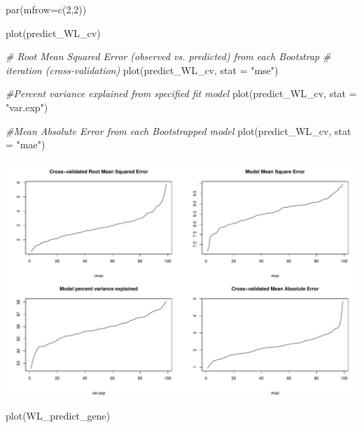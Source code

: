 \documentclass[
]{article}
\newenvironment{Shaded}{\begin{snugshade}}{\end{snugshade}}
\newcommand{\AttributeTok}[1]{\textcolor[rgb]{0.77,0.63,0.00}{#1}}
\newcommand{\CommentTok}[1]{\textcolor[rgb]{0.56,0.35,0.01}{\textit{#1}}}
\newcommand{\DecValTok}[1]{\textcolor[rgb]{0.00,0.00,0.81}{#1}}
\newcommand{\FunctionTok}[1]{\textcolor[rgb]{0.00,0.00,0.00}{#1}}
\newcommand{\NormalTok}[1]{#1}
\newcommand{\StringTok}[1]{\textcolor[rgb]{0.31,0.60,0.02}{#1}}
\begin{document}
\begin{Shaded}
\begin{Highlighting}[]
\FunctionTok{par}\NormalTok{(}\AttributeTok{mfrow=}\FunctionTok{c}\NormalTok{(}\DecValTok{2}\NormalTok{,}\DecValTok{2}\NormalTok{))}

\FunctionTok{plot}\NormalTok{(predict\_WL\_cv) }

\CommentTok{\# Root Mean Squared Error (observed vs. predicted) from each Bootstrap }
\CommentTok{\# iteration (cross{-}validation)}
\FunctionTok{plot}\NormalTok{(predict\_WL\_cv, }\AttributeTok{stat =} \StringTok{"mse"}\NormalTok{)}

\CommentTok{\#Percent variance explained from specified fit model}
\FunctionTok{plot}\NormalTok{(predict\_WL\_cv, }\AttributeTok{stat =} \StringTok{"var.exp"}\NormalTok{)}

\CommentTok{\#Mean Absolute Error from each Bootstrapped model}
\FunctionTok{plot}\NormalTok{(predict\_WL\_cv, }\AttributeTok{stat =} \StringTok{"mae"}\NormalTok{)}
\end{Highlighting}
\end{Shaded}

\includegraphics{8.Random_Forest_lab_gene_files/figure-latex/unnamed-chunk-4-1.pdf}

\begin{Shaded}
\begin{Highlighting}[]
\FunctionTok{plot}\NormalTok{(WL\_predict\_gene)}
\end{Highlighting}
\end{Shaded}
\end{document}
